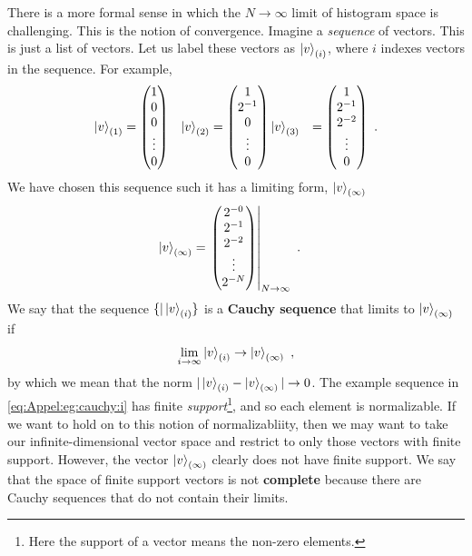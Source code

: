 There is a more formal sense in which the $N\to\infty$ limit of histogram space is challenging. This is the notion of convergence. Imagine a \emph{sequence} of vectors. This is just a list of vectors. Let us label these vectors as $\left|v\right\rangle_{(i)}$, where $i$ indexes vectors in the sequence. For example,
\begin{align}
    \left|v\right\rangle_{(1)} &=
    \begin{pmatrix}
        1 \\ 0 \\ 0 \\ \vdots \\ 0
    \end{pmatrix}
    &
    \left|v\right\rangle_{(2)} &=
    \begin{pmatrix}
        1 \\ 2^{-1} \\ 0 \\ \vdots \\ 0
    \end{pmatrix}
    \left|v\right\rangle_{(3)} &=
    \begin{pmatrix}
        1 \\ 2^{-1} \\ 2^{-2} \\ \vdots \\ 0
    \end{pmatrix} \ .
    \label{eq:Appel:eg:cauchy:i}
\end{align}
We have chosen this sequence such it has a limiting form, $\left|v\right\rangle_{(\infty)}$
\begin{align}
    \left|v\right\rangle_{(\infty)} &=
    \left.
    \begin{pmatrix}
        2^{-0} \\ 2^{-1} \\ 2^{-2} \\ \vdots \\ 2^{-N}
    \end{pmatrix}
    \right|_{N\to\infty} \ .
    \label{eq:Appel:eg:cauchy:N}
\end{align}
We say that the sequence $\{|\left|v\right\rangle_{(i)}\}$ is a \textbf{Cauchy sequence} that limits to $\left|v\right\rangle_{(\infty)}$ if 
\begin{align}
    \lim_{i\to\infty} \left|v\right\rangle_{(i)} \to \left|v\right\rangle_{(\infty)} \ ,
\end{align}
by which we mean that the norm $|\left|v\right\rangle_{(i)}-\left|v\right\rangle_{(\infty)}|\to 0$.  The example sequence in \eqref{eq:Appel:eg:cauchy:i} has finite \emph{support}\footnote{Here the support of a vector means the non-zero elements.}, and so each element is normalizable. If we want to hold on to this notion of normalizabliity, then we may want to take our infinite-dimensional vector space and restrict to only those vectors with finite support. However, the vector $\left|v\right\rangle_{(\infty)}$ clearly does not have finite support. We say that the space of finite support vectors is not \textbf{complete} because there are Cauchy sequences that do not contain their limits.
